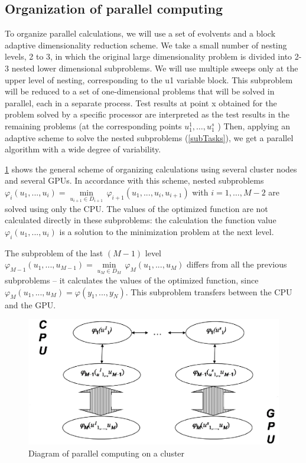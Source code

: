 \documentclass{svproc}
\begin{document}
\subsection{Organization of parallel computing}

To organize parallel calculations, we will use a set of evolvents and a block adaptive dimensionality reduction scheme. We take a small number of nesting levels, 2 to 3, in which the original large dimensionality problem is divided into 2-3 nested lower dimensional subproblems. We will use multiple sweeps only at the upper level of nesting, corresponding to the u1 variable block. This subproblem will be reduced to a set of one-dimensional problems that will be solved in parallel, each in a separate process. Test results at point x obtained for the problem solved by a specific processor are interpreted as the test results in the remaining problems (at the corresponding points \(u^1_1,… , u^s_1\) )
Then, applying an adaptive scheme to solve the nested subproblems (\ref{subTasks}), we get a parallel algorithm with a wide degree of variability.

\ref{fig:Parallel_Computing} shows the general scheme of organizing calculations using several cluster nodes and several GPUs. In accordance with this scheme, nested subproblems  ${{\varphi }_{i}}({{u}_{1}},...,{{u}_{i}})=\underset{{{u}_{i+1}}\in {{D}_{i+1}}}{\mathop{\min }}\,{{\varphi }_{i+1}}({{u}_{1}},...,{{u}_{i}},{{u}_{i+1}})$  with \(i=1,\ldots ,M-2\) are solved using only the CPU. The values of the optimized function are not calculated directly in these subproblems: the calculation the function value  ${{\varphi }_{i}}({{u}_{1}},...,{{u}_{i}})$ is a solution to the minimization problem at the next level.

The subproblem of the last \((M - 1)\) level \({{\varphi }_{M-1}}({{u}_{1}},...,{{u}_{M-1}})=\underset{{{u}_{M}}\in {{D}_{M}}}{\mathop{\min }}\,{{\varphi }_{M}}({{u}_{1}},...,{{u}_{M}})\) differs from all the previous subproblems – it calculates the values of the optimized function, since ${{\varphi }_{M}}({{u}_{1}},...,{{u}_{M}})=\varphi ({{y}_{1}},...,{{y}_{N}})$. This subproblem transfers between the CPU and the GPU.

   \begin{figure}[h!]
    \centering
		\includegraphics[width=1.0\textwidth]{Parallel_Computing.eps}
		\caption{Diagram of parallel computing on a cluster}\label{fig:Parallel_Computing}
\end{figure}
\end{document}
